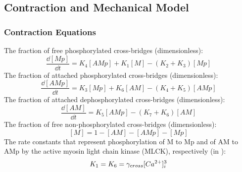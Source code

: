 \subsection{Contraction and Mechanical Model}

\subsubsection{Contraction Equations}
%
The fraction of free phosphorylated cross-bridges (dimensionless):
\begin{equation} \label{eq:dMpdt}
\frac{\dd[Mp]}{\dd t} = K_{4}[AMp] +K_{1} [M] - ( K_{2} + K_{3} ) [Mp]
\end{equation}
%
The fraction of attached phosphorylated cross-bridges (dimensionless):
\begin{equation} \label{eq:dAMpdt}
\frac{\dd[AMp]}{\dd t} =K_{3} [Mp] + K_{6} [AM] - ( K_{4} + K_{5} )[AMp]
\end{equation} 
%
The fraction of attached dephosphorylated cross-bridges (dimensionless):
\begin{equation} \label{eq:dAMdt}
\frac{\dd[AM]}{\dd t} = K_{5} [AMp]-(K_{7}+K_{6})[AM]
\end{equation}
%
The fraction of free non-phosphorylated cross-bridges (dimensionless):
\begin{equation} \label{eq:dMdt}
[M]=1-[AM]-[AMp]-[Mp]
\end{equation}
%
The rate constants that represent phosphorylation of M to Mp and of AM to AMp by the active myosin light chain kinase (MLCK), respectively (in \pers):
\begin{equation} \label{eq:gamma}
K_{1} = K_{6} = \gamma_{cross} [Ca^{2+}]_{i} ^{3}
\end{equation}
%
%

